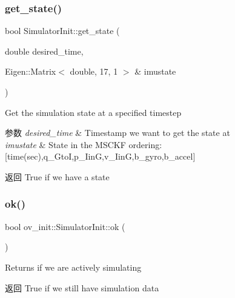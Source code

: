 \subsubsection{\texorpdfstring{get\+\_\+state()}{get\_state()}}
{\footnotesize\ttfamily bool Simulator\+Init\+::get\+\_\+state (\begin{DoxyParamCaption}\item[{double}]{desired\+\_\+time,  }\item[{Eigen\+::\+Matrix$<$ double, 17, 1 $>$ \&}]{imustate }\end{DoxyParamCaption})}



Get the simulation state at a specified timestep 


\begin{DoxyParams}{参数}
{\em desired\+\_\+time} & Timestamp we want to get the state at \\
\hline
{\em imustate} & State in the M\+S\+C\+KF ordering\+: \mbox{[}time(sec),q\+\_\+\+GtoI,p\+\_\+\+IinG,v\+\_\+\+IinG,b\+\_\+gyro,b\+\_\+accel\mbox{]} \\
\hline
\end{DoxyParams}
\begin{DoxyReturn}{返回}
True if we have a state 
\end{DoxyReturn}
\mbox{\label{classov__init_1_1SimulatorInit_a9a251dce8d062f3b152f9fa72a7f5dd1}} 
\subsubsection{\texorpdfstring{ok()}{ok()}}
{\footnotesize\ttfamily bool ov\+\_\+init\+::\+Simulator\+Init\+::ok (\begin{DoxyParamCaption}{ }\end{DoxyParamCaption})\hspace{0.3cm}{\ttfamily [inline]}}



Returns if we are actively simulating 

\begin{DoxyReturn}{返回}
True if we still have simulation data 
\end{DoxyReturn}
\mbox{\label{classov__init_1_1SimulatorInit_a34f9e98902032aeb2b695e1f72f56d15}} 
